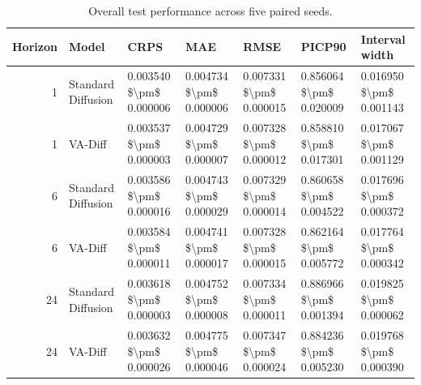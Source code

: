 \begin{table}
\caption{Overall test performance across five paired seeds.}
\label{tab:overall-performance}
\begin{tabular}{rllllll}
\toprule
Horizon & Model & CRPS & MAE & RMSE & PICP90 & Interval width \\
\midrule
1 & Standard Diffusion & 0.003540 \$\textbackslash pm\$ 0.000006 & 0.004734 \$\textbackslash pm\$ 0.000006 & 0.007331 \$\textbackslash pm\$ 0.000015 & 0.856064 \$\textbackslash pm\$ 0.020009 & 0.016950 \$\textbackslash pm\$ 0.001143 \\
1 & VA-Diff & 0.003537 \$\textbackslash pm\$ 0.000003 & 0.004729 \$\textbackslash pm\$ 0.000007 & 0.007328 \$\textbackslash pm\$ 0.000012 & 0.858810 \$\textbackslash pm\$ 0.017301 & 0.017067 \$\textbackslash pm\$ 0.001129 \\
6 & Standard Diffusion & 0.003586 \$\textbackslash pm\$ 0.000016 & 0.004743 \$\textbackslash pm\$ 0.000029 & 0.007329 \$\textbackslash pm\$ 0.000014 & 0.860658 \$\textbackslash pm\$ 0.004522 & 0.017696 \$\textbackslash pm\$ 0.000372 \\
6 & VA-Diff & 0.003584 \$\textbackslash pm\$ 0.000011 & 0.004741 \$\textbackslash pm\$ 0.000017 & 0.007328 \$\textbackslash pm\$ 0.000015 & 0.862164 \$\textbackslash pm\$ 0.005772 & 0.017764 \$\textbackslash pm\$ 0.000342 \\
24 & Standard Diffusion & 0.003618 \$\textbackslash pm\$ 0.000003 & 0.004752 \$\textbackslash pm\$ 0.000008 & 0.007334 \$\textbackslash pm\$ 0.000011 & 0.886966 \$\textbackslash pm\$ 0.001394 & 0.019825 \$\textbackslash pm\$ 0.000062 \\
24 & VA-Diff & 0.003632 \$\textbackslash pm\$ 0.000026 & 0.004775 \$\textbackslash pm\$ 0.000046 & 0.007347 \$\textbackslash pm\$ 0.000024 & 0.884236 \$\textbackslash pm\$ 0.005230 & 0.019768 \$\textbackslash pm\$ 0.000390 \\
\bottomrule
\end{tabular}
\end{table}
